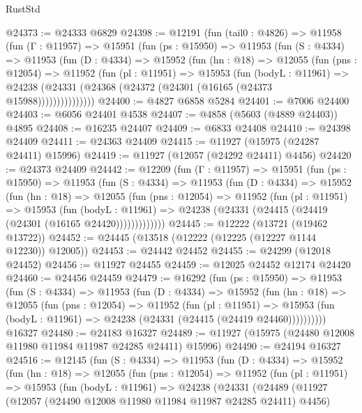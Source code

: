 \begin{lexlean}{RustStd}
\begin{coremodule}
@24373 := @24333 @6829
@24398 := @12191
    (fun (tail0 : @4826) =>
    @11958
      (fun (Γ : @11957) =>
      @15951
        (fun (ps : @15950) =>
        @11953
          (fun (S : @4334) =>
          @11953
            (fun (D : @4334) =>
            @15952
              (fun (hn : @18) =>
              @12055
                (fun (pns : @12054) =>
                @11952
                  (fun (pl : @11951) =>
                  @15953
                    (fun (bodyL : @11961) =>
                    @24238 (@24331 (@24368 (@24372 (@24301 (@16165 (@24373 @15988)))))))))))))))
@24400 := @4827 @6858 @5284
@24401 := @7006 @24400
@24403 := @6056 @24401 @4538
@24407 := @4858 (@5603 (@4889 @24403)) @4895
@24408 := @16235 @24407
@24409 := @6833 @24408
@24410 := @24398 @24409
@24411 := @24363 @24409
@24415 := @11927 (@15975 (@24287 @24411) @15996)
@24419 := @11927 (@12057 (@24292 @24411) @4456)
@24420 := @24373 @24409
@24442 := @12209
    (fun (Γ : @11957) =>
    @15951
      (fun (ps : @15950) =>
      @11953
        (fun (S : @4334) =>
        @11953
          (fun (D : @4334) =>
          @15952
            (fun (hn : @18) =>
            @12055
              (fun (pns : @12054) =>
              @11952
                (fun (pl : @11951) =>
                @15953
                  (fun (bodyL : @11961) =>
                  @24238 (@24331 (@24415 (@24419 (@24301 (@16165 @24420)))))))))))))
@24445 := @12222 (@13721 (@19462 @13722))
@24452 := @24445 (@13518 (@12222 (@12225 (@12227 @1144 @12230)) @12005))
@24453 := @24442 @24452
@24455 := @24299 (@12018 @24452)
@24456 := @11927 @24455
@24459 := @12025 @24452 @12174 @24420
@24460 := @24456 @24459
@24479 := @16292
    (fun (ps : @15950) =>
    @11953
      (fun (S : @4334) =>
      @11953
        (fun (D : @4334) =>
        @15952
          (fun (hn : @18) =>
          @12055
            (fun (pns : @12054) =>
            @11952
              (fun (pl : @11951) =>
              @15953 (fun (bodyL : @11961) => @24238 (@24331 (@24415 (@24419 @24460))))))))))
    @16327
@24480 := @24183 @16327
@24489 := @11927 (@15975 (@24480 @12008 @11980 @11984 @11987 @24285 @24411) @15996)
@24490 := @24194 @16327
@24516 := @12145
    (fun (S : @4334) =>
    @11953
      (fun (D : @4334) =>
      @15952
        (fun (hn : @18) =>
        @12055
          (fun (pns : @12054) =>
          @11952
            (fun (pl : @11951) =>
            @15953
              (fun (bodyL : @11961) =>
              @24238
                (@24331
                  (@24489
                    (@11927
                      (@12057 (@24490 @12008 @11980 @11984 @11987 @24285 @24411) @4456)

\end{coremodule}
\end{lexlean}
